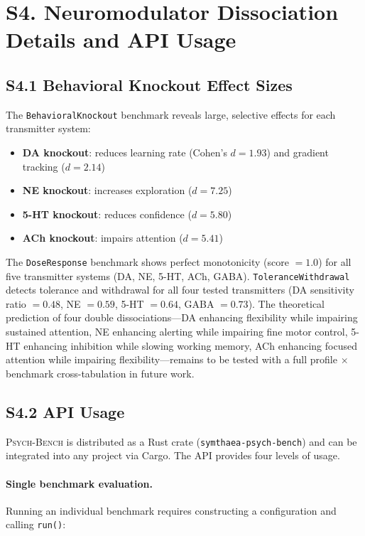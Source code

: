 \documentclass[10pt,landscape]{article}
\newcommand{\psychbench}{\textsc{Psych-Bench}}
\begin{document}
\clearpage
\section*{S4. Neuromodulator Dissociation Details and API Usage}

\subsection*{S4.1 Behavioral Knockout Effect Sizes}

The \texttt{BehavioralKnockout} benchmark reveals large, selective effects for each transmitter system:

\begin{itemize}
  \item \textbf{DA knockout}: reduces learning rate (Cohen's $d = 1.93$) and gradient tracking ($d = 2.14$)
  \item \textbf{NE knockout}: increases exploration ($d = 7.25$)
  \item \textbf{5-HT knockout}: reduces confidence ($d = 5.80$)
  \item \textbf{ACh knockout}: impairs attention ($d = 5.41$)
\end{itemize}

\noindent The \texttt{DoseResponse} benchmark shows perfect monotonicity (score $= 1.0$) for all five transmitter systems (DA, NE, 5-HT, ACh, GABA). \texttt{ToleranceWithdrawal} detects tolerance and withdrawal for all four tested transmitters (DA sensitivity ratio $= 0.48$, NE $= 0.59$, 5-HT $= 0.64$, GABA $= 0.73$). The theoretical prediction of four double dissociations---DA enhancing flexibility while impairing sustained attention, NE enhancing alerting while impairing fine motor control, 5-HT enhancing inhibition while slowing working memory, ACh enhancing focused attention while impairing flexibility---remains to be tested with a full profile $\times$ benchmark cross-tabulation in future work.

\subsection*{S4.2 API Usage}

\psychbench{} is distributed as a Rust crate (\texttt{symthaea-psych-bench}) and can be integrated into any project via Cargo. The API provides four levels of usage.

\paragraph{Single benchmark evaluation.} Running an individual benchmark requires constructing a configuration and calling \texttt{run()}:
\end{document}
